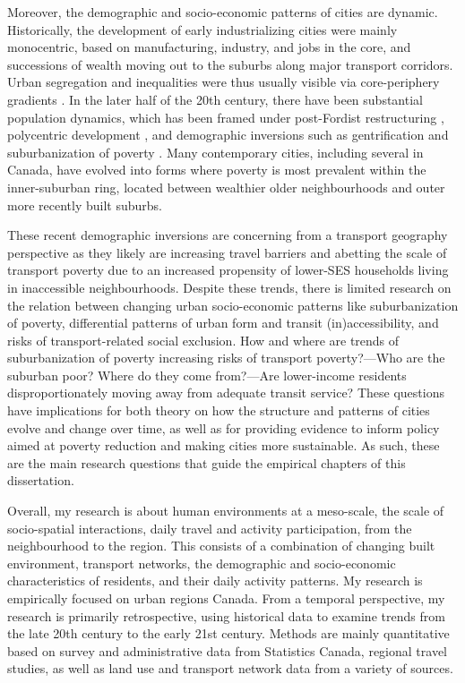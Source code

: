 Moreover, the demographic and socio-economic patterns of cities are dynamic. Historically, the development of early industrializing cities were mainly monocentric, based on manufacturing, industry, and jobs in the core, and successions of wealth moving out to the suburbs along major transport corridors. Urban segregation and inequalities were thus usually visible via core-periphery gradients \cite{burgess_growth_1925,alonso_location_1964,glaeser_sprawl_2004}. In the later half of the 20th century, there have been substantial population dynamics, which has been framed under post-Fordist restructuring \cite{walks_social_2001}, polycentric development \cite{anas_urban_1998}, and demographic inversions \cite{ehrenhalt_great_2012} such as gentrification \cite{vigdor_does_2002} and suburbanization of poverty \cite{ades_are_2012}. Many contemporary cities, including several in Canada, have evolved into forms where poverty is most prevalent within the inner-suburban ring, located between wealthier older neighbourhoods and outer more recently built suburbs.


These recent demographic inversions are concerning from a transport geography perspective as they likely are increasing travel barriers and abetting the scale of transport poverty due to an increased propensity of lower-SES households living in inaccessible neighbourhoods. Despite these trends, there is limited research on the relation between changing urban socio-economic patterns like suburbanization of poverty, differential patterns of urban form and transit (in)accessibility, and risks of transport-related social exclusion. How and where are trends of suburbanization of poverty increasing risks of transport poverty?---Who are the suburban poor? Where do they come from?---Are lower-income residents disproportionately moving away from adequate transit service? These questions have implications for both theory on how the structure and patterns of cities evolve and change over time, as well as for providing evidence to inform policy aimed at poverty reduction and making cities more sustainable. As such, these are the main research questions that guide the empirical chapters of this dissertation.


Overall, my research is about human environments at a meso-scale, the scale of socio-spatial interactions, daily travel and activity participation, from the neighbourhood to the region. This consists of a combination of changing built environment, transport networks, the demographic and socio-economic characteristics of residents, and their daily activity patterns. My research is empirically focused on urban regions Canada. From a temporal perspective, my research is primarily retrospective, using historical data to examine trends from the late 20th century to the early 21st century. Methods are mainly quantitative based on survey and administrative data from Statistics Canada, regional travel studies, as well as land use and transport network data from a variety of sources. 

